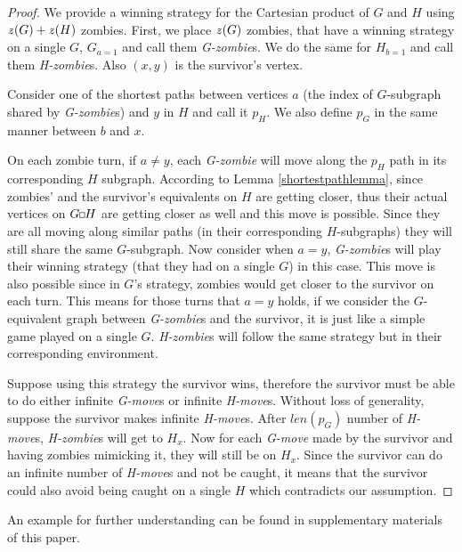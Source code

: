 \documentclass[1p]{elsarticle}
\newcommand{\zn}{\ooalign{$z$\cr\hfil\rule[.5ex]{.2em}{.08ex}\hfil\cr}}
\newcommand{\sq}[1][black]{%
\begin{tikzpicture}                                                           
  \draw[#1] (2pt,0pt) -- (6pt,0pt);   
  \draw[#1] (2pt,0pt) -- (2pt,4pt);    
  \draw[#1] (2pt,4pt) -- (6pt,4pt);   
  \draw[#1] (6pt,0pt) -- (6pt,4pt);
\end{tikzpicture}%
}
\begin{document}
\begin{proof}
	We provide a winning strategy for the Cartesian product of $G$ and $H$ using $\zn(G)+\zn(H)$ zombies. First, we place
	$\zn(G)$ zombies, that have a winning strategy on a single $G$, $G_{a = 1}$ and call them {\it G-zombie}s. We do the
	same for $H_{b = 1}$ and call them {\it H-zombie}s. Also $(x,y)$ is the survivor's vertex.


	Consider one of the shortest paths between vertices $a$ (the index of $G$-subgraph shared by {\it G-zombie}s) and
	$y$ in $H$ and call it $p_H$. We also define $p_G$ in the same manner between $b$ and $x$.


	On each zombie turn, if $a \neq y$, each {\it G-zombie} will move along the $p_H$ path in its corresponding $H$
	subgraph. According to Lemma \ref{shortestpathlemma}, since zombies' and the survivor's equivalents on $H$ are
	getting closer, thus their actual vertices on $G \sq H$ are getting closer as well and this move is possible. Since
	they are all moving along similar paths (in their corresponding $H$-subgraphs) they will still share the same
	$G$-subgraph. Now consider when $a = y$, {\it G-zombie}s will play their winning strategy (that they had on a single
	$G$) in this case. This move is also possible since in $G$'s strategy, zombies would get closer to the survivor on
	each turn. This means for those turns that $a=y$ holds, if we consider the $G$-equivalent graph between {\it
	G-zombie}s and the survivor, it is just like a simple game played on a single $G$. {\it H-zombie}s will follow the
	same strategy but in their corresponding environment.
	
	
	Suppose using this strategy the survivor wins, therefore the survivor must be able to do either infinite {\it
	G-move}s or infinite {\it H-move}s. Without loss of generality, suppose the survivor makes infinite {\it H-move}s.
	After $len(p_G)$ number of {\it H-move}s, {\it H-zombie}s will get to $H_x$. Now for each {\it G-move} made by the
	survivor and having zombies mimicking it, they will still be on $H_x$. Since the survivor can do an infinite number
	of {\it H-move}s and not be caught, it means that the survivor could also avoid being caught on a single $H$ which
	contradicts our assumption.
	
\end{proof}
An example for further understanding can be found in supplementary materials of this paper.
\end{document}
